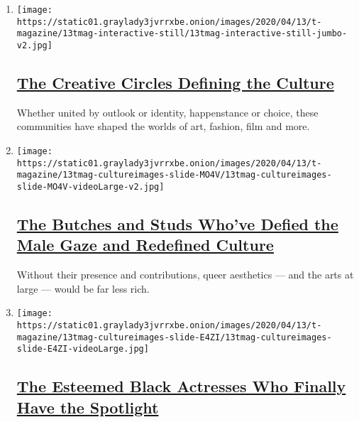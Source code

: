 \begin{enumerate}
\def\labelenumi{\arabic{enumi}.}
\item
  \texttt{[image: https://static01.graylady3jvrrxbe.onion/images/2020/04/13/t-magazine/13tmag-interactive-still/13tmag-interactive-still-jumbo-v2.jpg]}

  \hypertarget{the-creative-circles-defining-the-culture}{%
  \subsection{\texorpdfstring{\href{/interactive/2020/04/13/t-magazine/culture-issue-2020.html}{The
  Creative Circles Defining the
  Culture}}{The Creative Circles Defining the Culture}}\label{the-creative-circles-defining-the-culture}}

  Whether united by outlook or identity, happenstance or choice, these
  communities have shaped the worlds of art, fashion, film and more.
\item
  \texttt{[image: https://static01.graylady3jvrrxbe.onion/images/2020/04/13/t-magazine/13tmag-cultureimages-slide-MO4V/13tmag-cultureimages-slide-MO4V-videoLarge-v2.jpg]}

  \hypertarget{the-butches-and-studs-whove-defied-the-male-gaze-and-redefined-culture}{%
  \subsection{\texorpdfstring{\href{/interactive/2020/04/13/t-magazine/butch-stud-lesbian.html}{The
  Butches and Studs Who've Defied the Male Gaze and Redefined
  Culture}}{The Butches and Studs Who've Defied the Male Gaze and Redefined Culture}}\label{the-butches-and-studs-whove-defied-the-male-gaze-and-redefined-culture}}

  Without their presence and contributions, queer aesthetics --- and the
  arts at large --- would be far less rich.
\item
  \texttt{[image: https://static01.graylady3jvrrxbe.onion/images/2020/04/13/t-magazine/13tmag-cultureimages-slide-E4ZI/13tmag-cultureimages-slide-E4ZI-videoLarge.jpg]}

  \hypertarget{the-esteemed-black-actresses-who-finally-have-the-spotlight}{%
  \subsection{\texorpdfstring{\href{/interactive/2020/04/13/t-magazine/black-actresses-bassett-berry-blige-henson-whitfield-elise.html}{The
  Esteemed Black Actresses Who Finally Have the
  Spotlight}}{The Esteemed Black Actresses Who Finally Have the Spotlight}}\label{the-esteemed-black-actresses-who-finally-have-the-spotlight}}


\end{enumerate}
